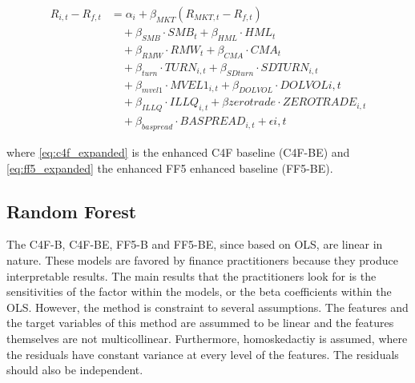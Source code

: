 \begin{equation}
    \label{eq:ff5_expanded}
    \begin{split}
    R_{i,t} - R_{f,t} &= \alpha_i + \beta_{MKT} (R_{MKT,t} - R_{f,t}) \\
    &\quad + \beta_{SMB} \cdot SMB_t + \beta_{HML} \cdot HML_t \\
    &\quad + \beta_{RMW} \cdot RMW_t + \beta_{CMA} \cdot CMA_t\\
    &\quad + \beta_{turn} \cdot TURN_{i,t} + \beta_{SDturn} \cdot SDTURN_{i,t} \\
    &\quad + \beta_{mvel1} \cdot MVEL1_{i,t} + \beta_{DOLVOL} \cdot DOLVOL{i,t} \\
    &\quad + \beta_{ILLQ} \cdot ILLQ_{i,t} + \beta{zerotrade} \cdot ZEROTRADE_{i,t} \\
    &\quad + \beta_{baspread} \cdot BASPREAD_{i,t} + \epsilon{i,t}
    \end{split}
\end{equation}

where \cref{eq:c4f_expanded} is the enhanced C4F baseline (C4F-BE) and \cref{eq:ff5_expanded} the enhanced FF5 enhanced baseline (FF5-BE). %


\subsection{Random Forest}



The C4F-B, C4F-BE, FF5-B and FF5-BE, since based on OLS, are linear in nature. These models are favored by finance practitioners because they produce interpretable results. The main results that the practitioners look for is the sensitivities of the factor within the models, or the beta coefficients within the OLS. However, the method is constraint to several assumptions. The features and the target variables of this method are assummed to be linear and the features themselves are not multicollinear. Furthermore, homoskedactiy is assumed, where the residuals have constant variance at every level of the features. The residuals should also be independent.

